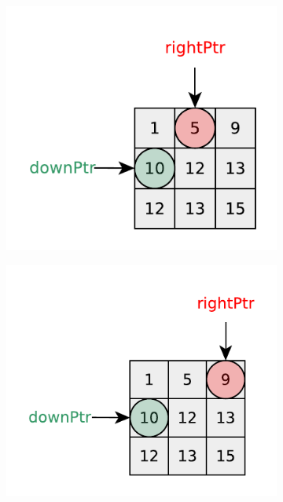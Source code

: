 \begin{figure}
    \centering
    \begin{subfigure}[t]{0.32\textwidth}
        \includegraphics[width=1\linewidth]{sources/kth_smallest_in_sorted_matrix/images/visit1}
        \caption{}
        \label{fig:kth_smallest_in_sorted_matrix:visit1}
     \end{subfigure}
    \hfill
    \begin{subfigure}[t]{0.32\textwidth}
        \includegraphics[width=1\linewidth]{sources/kth_smallest_in_sorted_matrix/images/visit2}

\end{subfigure}
\end{figure}
